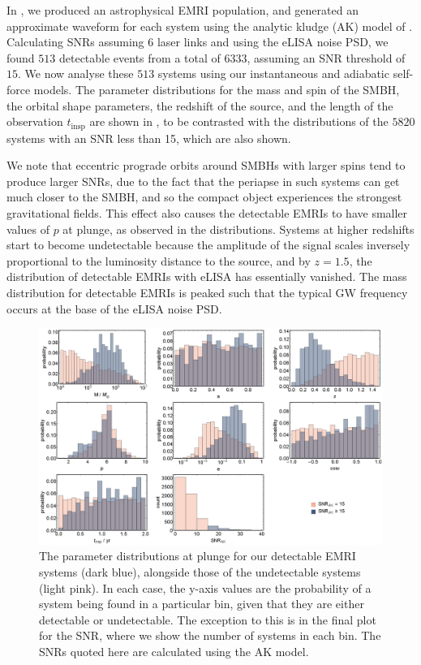 In , we produced an astrophysical EMRI population, and generated an approximate waveform for each system using the analytic kludge (AK) model of \citet{barack_lisa_2004}. Calculating SNRs assuming 6 laser links and using the eLISA noise PSD, we found $513$ detectable events from a total of $6333$, assuming an SNR threshold of $15$. We now analyse these $513$ systems using our instantaneous and adiabatic self-force models. The parameter distributions for the mass and spin of the SMBH, the orbital shape parameters, the redshift of the source, and the length of the observation $t_\mathrm{insp}$ are shown in , to be contrasted with the distributions of the $5820$ systems with an SNR less than 15, which are also shown.

We note that eccentric prograde orbits around SMBHs with larger spins tend to produce larger SNRs, due to the fact that the periapse in such systems can get much closer to the SMBH, and so the compact object experiences the strongest gravitational fields. This effect also causes the detectable EMRIs to have smaller values of $p$ at plunge, as observed in the distributions. Systems at higher redshifts start to become undetectable because the amplitude of the signal scales inversely proportional to the luminosity distance to the source, and by $z=1.5$, the distribution of detectable EMRIs with eLISA has essentially vanished. The mass distribution for detectable EMRIs is peaked such that the typical GW frequency occurs at the base of the eLISA noise PSD.

\begin{figure}[htbp]
\centering
\includegraphics[width=\textwidth]{EMRIpar_dists}
\caption{\label{fig:EMRIpar-dists}The parameter distributions at plunge for our detectable EMRI systems (dark blue), alongside those of the undetectable systems (light pink). In each case, the y-axis values are the probability of a system being found in a particular bin, given that they are either detectable or undetectable. The exception to this is in the final plot for the SNR, where we show the number of systems in each bin. The SNRs quoted here are calculated using the AK model.}
\end{figure}

